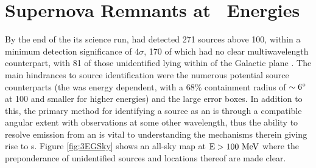 \section{\label{Rems:latGam}Supernova Remnants at \gam~Energies}

By the end of the its science run, \egret{} had detected 271 sources above 100\mev{}, within a minimum detection significance of 4$\sigma$, 170 of which had no clear multiwavelength counterpart, with 81 of those unidentified lying within \blat of the Galactic plane \citep{Hartman99}. The main hindrances to source identification were the numerous potential source counterparts (the \egret{} \psf{} was energy dependent, with a 68\% containment radius of ${\rm \sim 6 ^\circ}$ at 100\mev{} and smaller for higher energies) and the large \egret{} error boxes. In addition to this, the primary method for identifying a \gam{} source as an \snr{} is through a compatible angular extent with  observations at some other wavelength, thus the ability to resolve emission from an \snr{} is vital to understanding the mechanisms therein giving rise to \gam{}s. Figure \ref{fig:3EGSky} shows an \egret{} all-sky map at ${\rm E > 100 ~\mathrm{MeV}}$ where the preponderance of unidentified sources and locations thereof are made clear.

